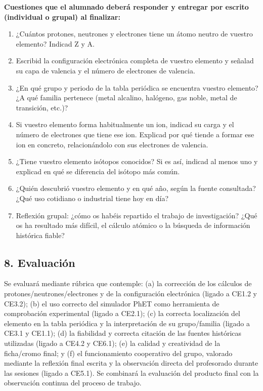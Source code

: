 \documentclass[11pt,a4paper]{article}
\begin{document}
\textbf{Cuestiones que el alumnado deberá responder y entregar por escrito (individual o grupal) al finalizar:}
\begin{enumerate}
    \item ¿Cuántos protones, neutrones y electrones tiene un átomo neutro de vuestro elemento? Indicad Z y A.
    \item Escribid la configuración electrónica completa de vuestro elemento y señalad su capa de valencia y el número de electrones de valencia.
    \item ¿En qué grupo y periodo de la tabla periódica se encuentra vuestro elemento? ¿A qué familia pertenece (metal alcalino, halógeno, gas noble, metal de transición, etc.)?
    \item Si vuestro elemento forma habitualmente un ion, indicad su carga y el número de electrones que tiene ese ion. Explicad por qué tiende a formar ese ion en concreto, relacionándolo con sus electrones de valencia.
    \item ¿Tiene vuestro elemento isótopos conocidos? Si es así, indicad al menos uno y explicad en qué se diferencia del isótopo más común.
    \item ¿Quién descubrió vuestro elemento y en qué año, según la fuente consultada? ¿Qué uso cotidiano o industrial tiene hoy en día?
    \item Reflexión grupal: ¿cómo os habéis repartido el trabajo de investigación? ¿Qué os ha resultado más difícil, el cálculo atómico o la búsqueda de información histórica fiable?
\end{enumerate}

\subsection*{8. Evaluación}
Se evaluará mediante rúbrica que contemple: (a) la corrección de los cálculos de protones/neutrones/electrones y de la configuración electrónica (ligado a CE1.2 y CE3.2); (b) el uso correcto del simulador PhET como herramienta de comprobación experimental (ligado a CE2.1); (c) la correcta localización del elemento en la tabla periódica y la interpretación de su grupo/familia (ligado a CE3.1 y CE1.1); (d) la fiabilidad y correcta citación de las fuentes históricas utilizadas (ligado a CE4.2 y CE6.1); (e) la calidad y creatividad de la ficha/cromo final; y (f) el funcionamiento cooperativo del grupo, valorado mediante la reflexión final escrita y la observación directa del profesorado durante las sesiones (ligado a CE5.1). Se combinará la evaluación del producto final con la observación continua del proceso de trabajo.
\end{document}
